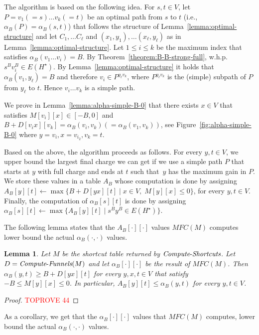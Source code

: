 \documentclass[11pt]{article}
\newtheorem{lemma}[theorem]{Lemma}
\newcommand{\ComputeF}{\mbox{{\it Compute}-{\it Funnels}}}
\newcommand{\ComputeS}{\mbox{{\it Compute}-{\it Shortcuts}}}
\begin{document}
The algorithm is based on the following idea. For $s,t \in V$, let~$P=v_1(=s)\ldots v_k(=t)$ be an optimal path from $s$ to $t$ (i.e., $\alpha_B(P)=\alpha_B(s,t)$) that follows the structure of Lemma~\ref{lemma:optimal-structure} and let $C_1, \ldots C_{\ell}$ and $(x_1,y_1),\ldots(x_{\ell},y_{\ell})$ as in Lemma~\ref{lemma:optimal-structure}.
Let $1\le i \le k$ be the maximum index that satisfies $\alpha_B(v_1 \ldots v_i) = B$. By Theorem~\ref{theorem:B-B-strong-full}, w.h.p.\ $s^B v_i^B \in E(H^\star)$. 
By Lemma~\ref{lemma:optimal-structure} it holds that $\alpha_B(v_1,y_{\ell})=B$ and therefore $v_i \in P^{y_{\ell}v_k}$, where $P^{y_{\ell}v_k}$ is the (simple) subpath of $P$ from $y_{\ell}$ to $t$. Hence $v_i \ldots v_k$ is a simple path.


We prove in Lemma~\ref{lemma:alpha-simple-B-0} that there exists $x\in V$ that satisfies $M[v_i][x]\in [-B,0]$ and $B+D[v_i x][v_k] = \alpha_B(v_i,v_k)(=\alpha_B(v_1,v_k))$, see Figure~\ref{fig:alpha-simple-B-0} where $y=v_i, x=v_{i_2},v_k=t$. 


Based on the above, the algorithm proceeds as follows. For every $y,t\in V$, we upper bound the largest final charge we can get if we use a simple path $P$ that starts at $y$ with full charge and ends at $t$ such that~$y$ has the maximum gain in $P$. We store these values in a table $A_B$ whose computation is done by assigning $A_B[y][t] \gets \max \{B+D[yx][t] \mid x\in V, \; M[y][x] \le 0 \} $, for every $y,t\in V$. Finally, the computation of  $\alpha_B[s][t]$ is done by assigning $\alpha_B[s][t] \gets \max \{ A_B[y][t] \mid s^B y^B \in E(H^\star)\}$.


The following lemma states that the $A_B[\cdot][\cdot]$ values $MFC(M)$ computes lower bound the actual $\alpha_B(\cdot,\cdot)$ values.

\begin{lemma}\label{lem:alphaB-bounds-D}
    Let $M$ be the shortcut table returned by $\ComputeS$. Let $D=\ComputeF(M)$ and let $\alpha_B[\cdot][\cdot]$ be the result of $MFC(M)$. Then $\alpha_B(y,t) \ge B +  D[yx][t]$ for every $y,x,t\in V$ that satisfy $-B \le M[y][x] \le 0$. In particular, $A_B[y][t] \le \alpha_B(y,t)$ for every $y,t\in V$.
\end{lemma}

\begin{proof}\textcolor{red}{TOPROVE 44}\end{proof}

As a corollary, we get that the $\alpha_B[\cdot][\cdot]$ values that $MFC(M)$ computes, lower bound the actual $\alpha_B(\cdot,\cdot)$ values.
\end{document}

